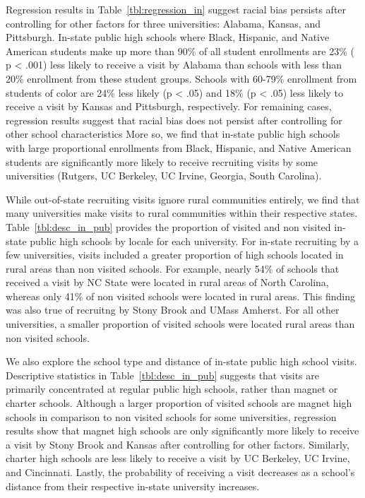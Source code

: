 \documentclass[twoside]{article}
\begin{document}
Regression results in Table~\ref{tbl:regression_in} suggest racial bias persists after controlling for other factors for three universities: Alabama, Kansas, and Pittsburgh. In-state public high schools where Black, Hispanic, and Native American students make up more than 90\% of all student enrollments are 23\% ( p < .001) less likely to receive a visit by Alabama than schools with less than 20\% enrollment from these student groups. Schools with 60-79\% enrollment from students of color are 24\% less likely (p < .05) and 18\% (p < .05) less likely to receive a visit by Kansas and Pittsburgh, respectively. For remaining cases, regression results suggest that racial bias does not persist after controlling for other school characteristics More so, we find that in-state public high schools with large proportional enrollments from Black, Hispanic, and Native American students are significantly more likely to receive recruiting visits by some universities (Rutgers, UC Berkeley, UC Irvine, Georgia, South Carolina).

While out-of-state recruiting visits ignore rural communities entirely, we find that many universities make visits to rural communities within their respective states. Table~\ref{tbl:desc_in_pub} provides the proportion of visited and non visited in-state public high schools by locale for each university. For in-state recruiting by a few universities, visits included a greater proportion of high schools located in rural areas than non visited schools. For example, nearly 54\% of schools that received a visit by NC State were located in rural areas of North Carolina, whereas only 41\% of non visited schools were located in rural areas. This finding was also true of recruitng by Stony Brook and UMass Amherst. For all other universities, a smaller proportion of visited schools were located rural areas than non visited schools.

We also explore the school type and distance of in-state public high school visits. Descriptive statistics in Table~\ref{tbl:desc_in_pub} suggests that visits are primarily concentrated at regular public high schools, rather than magnet or charter schools. Although a larger proportion of visited schools are magnet high schools in comparison to non visited schools for some universities, regression results show that magnet high schools are only significantly more likely to receive a visit by Stony Brook and Kansas after controlling for other factors. Similarly, charter high schools are less likely to receive a visit by UC Berkeley, UC Irvine, and Cincinnati.  Lastly, the probability of receiving a visit decreases as a school’s distance from their respective in-state university increases.
\end{document}
